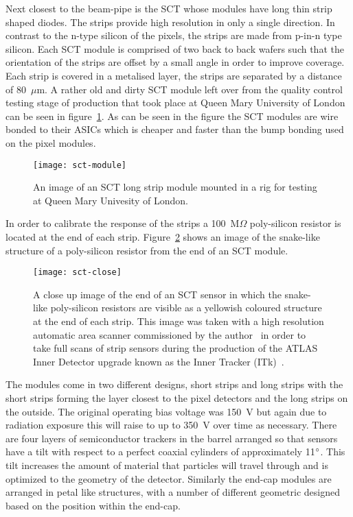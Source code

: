 Next closest to the beam-pipe is the SCT whose modules have long thin strip
shaped diodes. The strips provide high resolution in only a single direction. In
contrast to the n-type silicon of the pixels, the strips are made from p-in-n
type silicon. Each SCT module is comprised of two back to back wafers such that
the orientation of the strips are offset by a small angle in order to improve
coverage. Each strip is covered in a metalised layer, the strips are separated
by a distance of 80~$\mu$m. A rather old and dirty SCT module left over from the
quality control testing stage of production that took place at Queen Mary
University of London can be seen in figure~\ref{fig:strip-module}. As can be
seen in the figure the SCT modules are wire bonded to their ASICs which is
cheaper and faster than the bump bonding used on the pixel modules.
\begin{figure}[ht]
  \centering
  \texttt{[image: sct-module]}
  \caption[ATLAS long strip module]{An image of an SCT long strip module
    mounted in a rig for testing at Queen Mary Univesity of London.}
  \label{fig:strip-module}
\end{figure}
In order to calibrate the response of the strips a 100~M$\Omega$ poly-silicon
resistor is located at the end of each strip. Figure~\ref{fig:sct-close} shows an
image of the snake-like structure of a poly-silicon resistor from the end of an
SCT module.
\begin{figure}[ht]
  \centering
  \texttt{[image: sct-close]}
  \caption[ATLAS strip close-up]{A close up image of the end of an SCT sensor in
    which the snake-like poly-silicon resistors are visible as a yellowish
    coloured structure at the end of each strip. This image was taken with a
    high resolution automatic area scanner commissioned by the
    author~\cite{itk-scanner} in order to take full scans of strip sensors
    during the production of the ATLAS Inner Detector upgrade known as the Inner
    Tracker (ITk)~\cite{itk-tdr, itk-strips-tdr}.}
  \label{fig:sct-close}
\end{figure}
The modules come in two different designs, short strips and long
strips with the short strips forming the layer closest to the pixel detectors
and the long strips on the outside. The original operating bias voltage was
150~V but again due to radiation exposure this will raise to up to 350~V over
time as necessary. There are four layers of semiconductor trackers in the barrel
arranged so that sensors have a tilt with respect to a perfect coaxial cylinders
of approximately 11$\degree$. This tilt increases the amount of material that
particles will travel through and is optimized to the geometry of the detector.
Similarly the end-cap modules are arranged in petal like structures, with a
number of different geometric designed based on the position within the end-cap.

